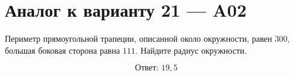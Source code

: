 


\section*{Аналог к варианту 21 — A02}
Периметр прямоугольной трапеции, описанной около окружности, равен \(300\), большая боковая сторона равна \(111\). Найдите радиус окружности.
\begin{center}\end{center}
\[\boxed{\text{Ответ: }19,5}\]

